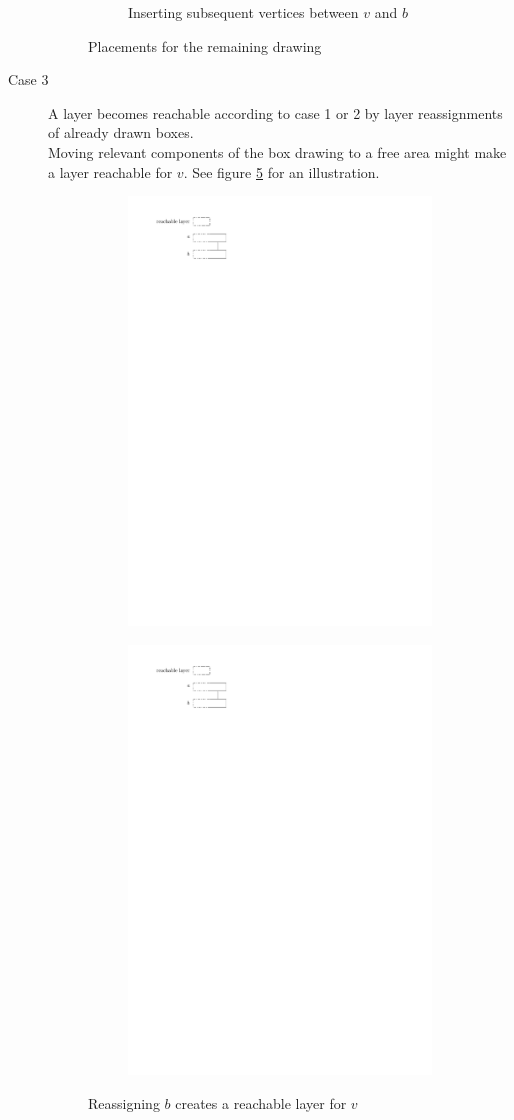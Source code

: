 \begin{description}
\begin{figure}[H]
\begin{subfigure}{0.7\textwidth}
			\caption{Inserting subsequent vertices between $v$ and $b$}\label{im:reachable_layer_atop_vertex_placement_2b}
		\end{subfigure}
		\caption{Placements for the remaining drawing}\label{im:reachable_layer_atop_vertex_placement_2}
	\end{figure}
	\item[Case 3] A layer becomes reachable according to case 1 or 2 by layer reassignments of already drawn boxes.\\
	Moving relevant components of the box drawing to a free area might make a layer reachable for $v$. See figure \ref{im:reachable_layer_atop_vertex_placement_3} for an illustration.
			\begin{figure}[H]
		\centering
		\begin{subfigure}{0.4\textwidth}
			\centering
			\includegraphics[page=5,width=0.4\linewidth]{graphics/maximal_outerplanar_reachable_layers.pdf}
			\caption{}\label{im:reachable_layer_atop_vertex_placement_3a}
		\end{subfigure}
		\begin{subfigure}{0.4\textwidth}
			\centering
			\includegraphics[page=6,width=0.4\linewidth]{graphics/maximal_outerplanar_reachable_layers.pdf}
			\caption{}\label{im:reachable_layer_atop_vertex_placement_3b}
		\end{subfigure}
		\caption{Reassigning $b$ creates a reachable layer for $v$}\label{im:reachable_layer_atop_vertex_placement_3}
		\end{figure}
\end{description}
